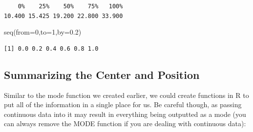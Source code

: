 \documentclass[
  letterpaper,
  DIV=11,
  numbers=noendperiod]{scrreprt}
\newenvironment{Shaded}{\begin{snugshade}}{\end{snugshade}}
\newcommand{\AttributeTok}[1]{\textcolor[rgb]{0.40,0.45,0.13}{#1}}
\newcommand{\DecValTok}[1]{\textcolor[rgb]{0.68,0.00,0.00}{#1}}
\newcommand{\FloatTok}[1]{\textcolor[rgb]{0.68,0.00,0.00}{#1}}
\newcommand{\FunctionTok}[1]{\textcolor[rgb]{0.28,0.35,0.67}{#1}}
\newcommand{\NormalTok}[1]{\textcolor[rgb]{0.00,0.23,0.31}{#1}}
\newcommand{\SpecialCharTok}[1]{\textcolor[rgb]{0.37,0.37,0.37}{#1}}
\begin{document}
\begin{Shaded}
\end{Shaded}

\begin{verbatim}
    0%    25%    50%    75%   100% 
10.400 15.425 19.200 22.800 33.900 
\end{verbatim}

\begin{Shaded}
\begin{Highlighting}[]
\FunctionTok{seq}\NormalTok{(}\AttributeTok{from=}\DecValTok{0}\NormalTok{,}\AttributeTok{to=}\DecValTok{1}\NormalTok{,}\AttributeTok{by=}\FloatTok{0.2}\NormalTok{)}
\end{Highlighting}
\end{Shaded}

\begin{verbatim}
[1] 0.0 0.2 0.4 0.6 0.8 1.0
\end{verbatim}

\subsection{Summarizing the Center and
Position}\label{summarizing-the-center-and-position}

Similar to the mode function we created earlier, we could create
functions in R to put all of the information in a single place for us.
Be careful though, as passing continuous data into it may result in
everything being outputted as a mode (you can always remove the MODE
function if you are dealing with continuous data):
\end{document}
